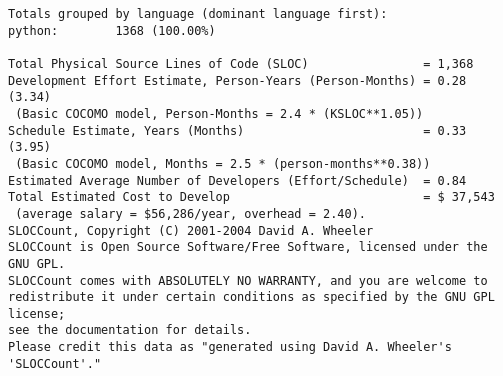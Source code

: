 \begin{verbatim}
Totals grouped by language (dominant language first):
python:        1368 (100.00%)

Total Physical Source Lines of Code (SLOC)                = 1,368
Development Effort Estimate, Person-Years (Person-Months) = 0.28 (3.34)
 (Basic COCOMO model, Person-Months = 2.4 * (KSLOC**1.05))
Schedule Estimate, Years (Months)                         = 0.33 (3.95)
 (Basic COCOMO model, Months = 2.5 * (person-months**0.38))
Estimated Average Number of Developers (Effort/Schedule)  = 0.84
Total Estimated Cost to Develop                           = $ 37,543
 (average salary = $56,286/year, overhead = 2.40).
SLOCCount, Copyright (C) 2001-2004 David A. Wheeler
SLOCCount is Open Source Software/Free Software, licensed under the GNU GPL.
SLOCCount comes with ABSOLUTELY NO WARRANTY, and you are welcome to
redistribute it under certain conditions as specified by the GNU GPL license;
see the documentation for details.
Please credit this data as "generated using David A. Wheeler's 'SLOCCount'."
\end{verbatim}
